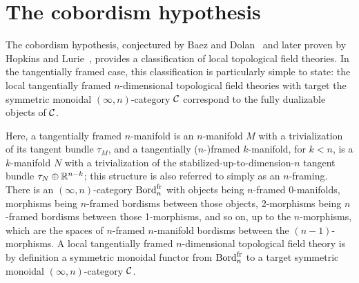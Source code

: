 \documentclass{amsart}
\begin{document}









\appendix
\section{The cobordism hypothesis}

The cobordism hypothesis, conjectured by Baez and Dolan~\cite{MR1355899} and later proven by Hopkins and Lurie~\cite{lurie-ch}, provides a classification of local topological field theories.  In the tangentially framed case, this classification is particularly simple to state: the local tangentially framed $n$-dimensional topological field theories with target the symmetric monoidal $(\infty,n)$-category $\mathcal C$ correspond to the fully dualizable objects of $\mathcal C$.  

Here, a tangentially framed $n$-manifold is an $n$-manifold $M$ with a trivialization of its tangent bundle $\tau_M$, and a tangentially ($n$-)framed $k$-manifold, for $k < n$, is a $k$-manifold $N$ with a trivialization of the stabilized-up-to-dimension-$n$ tangent bundle $\tau_N \oplus \mathbb R^{n-k}$; this structure is also referred to simply as an $n$-framing.  There is an $(\infty,n)$-category $\mathrm{Bord}^\mathrm{fr}_n$ with objects being $n$-framed $0$-manifolds, morphisms being $n$-framed bordisms between those objects, 2-morphisms being $n$-framed bordisms between those 1-morphisms, and so on, up to the $n$-morphisms, which are the spaces of $n$-framed $n$-manifold bordisms between the $(n-1)$-morphisms.  A local tangentially framed $n$-dimensional topological field theory is by definition a symmetric monoidal functor from $\mathrm{Bord}^\mathrm{fr}_n$ to a target symmetric monoidal $(\infty,n)$-category $\mathcal C$.
\end{document}
